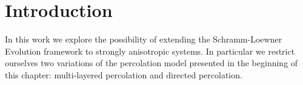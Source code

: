 \chapter{Introduction}
\label{ch:intro}


In this work we explore the possibility of extending the Schramm-Loewner
Evolution framework to strongly anisotropic systems. In particular we restrict
ourselves two variations of the percolation model presented in the beginning of
this chapter: multi-layered percolation and directed percolation.
